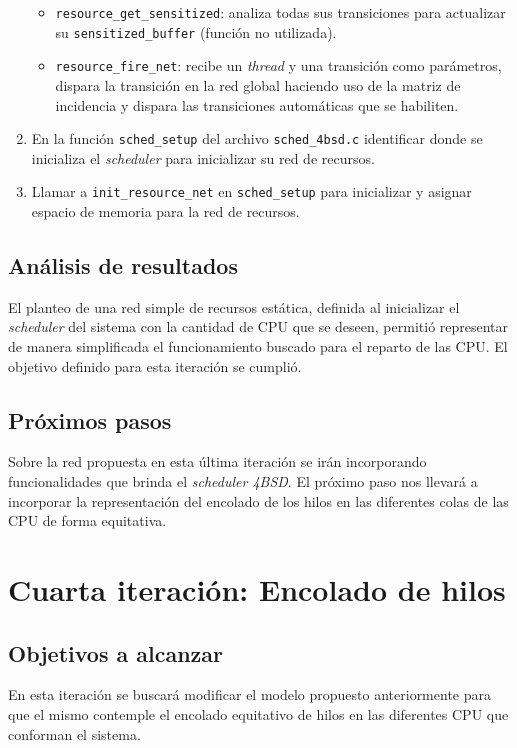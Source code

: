\documentclass[a4paper]{book}
\begin{document}
\begin{enumerate}
\begin{itemize}
\item \verb|resource_get_sensitized|: analiza todas sus transiciones para actualizar su \verb|sensitized_buffer| (funci\'on no utilizada).
\item \verb|resource_fire_net|: recibe un \emph{thread} y una transici\'on como par\'ametros, dispara la transici\'on en la red global haciendo uso de la matriz de incidencia y dispara las transiciones autom\'aticas que se habiliten.
\end{itemize}
\item En la funci\'on \verb|sched_setup| del archivo \verb|sched_4bsd.c| identificar donde se inicializa el \emph{scheduler} para inicializar su red de recursos.
\item Llamar a \verb|init_resource_net| en \verb|sched_setup| para inicializar y asignar espacio de memoria para la red de recursos.
\end{enumerate}

\subsection{An\'alisis de resultados}
El planteo de una red simple de recursos est\'atica, definida al inicializar el \emph{scheduler} del sistema con la cantidad de CPU que se deseen, permiti\'o representar de manera simplificada el funcionamiento buscado para el reparto de las CPU. El objetivo definido para esta iteraci\'on se cumplió.

\subsection{Pr\'oximos pasos}
Sobre la red propuesta en esta \'ultima iteraci\'on se ir\'an incorporando funcionalidades que brinda el \emph{scheduler 4BSD}. El pr\'oximo paso nos llevar\'a a incorporar la representaci\'on del encolado de los hilos en las diferentes colas de las CPU de forma equitativa.


\newpage
\section{Cuarta iteraci\'on: Encolado de hilos}

\subsection{Objetivos a alcanzar}
En esta iteraci\'on se buscar\'a modificar el modelo propuesto anteriormente para que el mismo contemple el encolado equitativo de hilos en las diferentes CPU que conforman el sistema.
\end{document}
